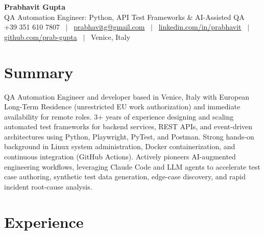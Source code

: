 \documentclass[a4paper,10pt]{article}
\begin{document}
\begin{minipage}[c]{0.80\textwidth}
 {\Huge\bfseries Prabhavit Gupta}\\[3pt]
 {\color{accent}\large QA Automation Engineer: Python, API Test Frameworks \& AI-Assisted QA}\\[6pt]
 {\footnotesize +39 351 610 7807 ~$\vert$~
 \href{mailto:prabhavitg@gmail.com}{prabhavitg@gmail.com} ~$\vert$~
 \href{https://www.linkedin.com/in/prabhavit/}{linkedin.com/in/prabhavit} ~$\vert$~
 \href{https://github.com/prab-gupta}{github.com/prab-gupta} ~$\vert$~
 Venice, Italy}
\end{minipage}\hfill

\section{Summary}
QA Automation Engineer and developer based in Venice, Italy with European Long-Term Residence (unrestricted EU work authorization) and immediate availability for remote roles. 3+ years of experience designing and scaling automated test frameworks for backend services, REST APIs, and event-driven architectures using Python, Playwright, PyTest, and Postman. Strong hands-on background in Linux system administration, Docker containerization, and continuous integration (GitHub Actions). Actively pioneers AI-augmented engineering workflows, leveraging Claude Code and LLM agents to accelerate test case authoring, synthetic test data generation, edge-case discovery, and rapid incident root-cause analysis.

\section{Experience}
\end{document}
